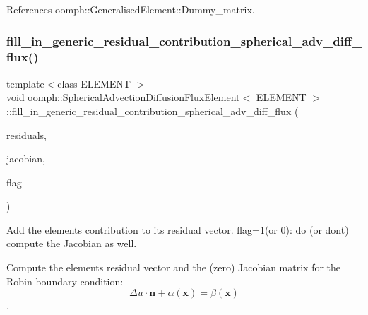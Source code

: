 References oomph\+::\+Generalised\+Element\+::\+Dummy\+\_\+matrix.

\mbox{\label{classoomph_1_1SphericalAdvectionDiffusionFluxElement_a7dd7a4627052f615642c64eea143e4c5}} 
\subsubsection{\texorpdfstring{fill\+\_\+in\+\_\+generic\+\_\+residual\+\_\+contribution\+\_\+spherical\+\_\+adv\+\_\+diff\+\_\+flux()}{fill\_in\_generic\_residual\_contribution\_spherical\_adv\_diff\_flux()}}
{\footnotesize\ttfamily template$<$class E\+L\+E\+M\+E\+NT $>$ \\
void \hyperlink{classoomph_1_1SphericalAdvectionDiffusionFluxElement}{oomph\+::\+Spherical\+Advection\+Diffusion\+Flux\+Element}$<$ E\+L\+E\+M\+E\+NT $>$\+::fill\+\_\+in\+\_\+generic\+\_\+residual\+\_\+contribution\+\_\+spherical\+\_\+adv\+\_\+diff\+\_\+flux (\begin{DoxyParamCaption}\item[{\hyperlink{classoomph_1_1Vector}{Vector}$<$ double $>$ \&}]{residuals,  }\item[{\hyperlink{classoomph_1_1DenseMatrix}{Dense\+Matrix}$<$ double $>$ \&}]{jacobian,  }\item[{unsigned}]{flag }\end{DoxyParamCaption})\hspace{0.3cm}{\ttfamily [private]}}



Add the element\textquotesingle{}s contribution to its residual vector. flag=1(or 0)\+: do (or don\textquotesingle{}t) compute the Jacobian as well. 

Compute the element\textquotesingle{}s residual vector and the (zero) Jacobian matrix for the Robin boundary condition\+: \[ \Delta u \cdot \mathbf{n} + \alpha (\mathbf{x}) = \beta (\mathbf{x}) \]. 

